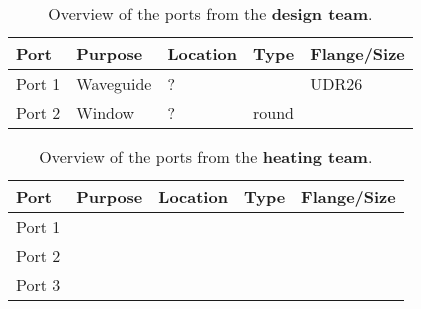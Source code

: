 \documentclass{article}
\begin{document}
\begin{table}[H]
    \centering
    \caption{Overview of the ports from the \textbf{design team}.}
    \begin{tabular}{>{\raggedright\arraybackslash}p{2cm} >{\raggedright\arraybackslash}p{3cm} >{\raggedright\arraybackslash}p{3.5cm} >{\raggedright\arraybackslash}p{3.5cm} >{\raggedright\arraybackslash}p{2cm}}
        \toprule
        \textbf{Port} & \textbf{Purpose} & \textbf{Location} & \textbf{Type} & \textbf{Flange/Size} \\
        \midrule
        Port 1        & Waveguide        & ?                 &               & UDR26                \\
        Port 2        & Window           & ?                 & round         &                      \\
        \bottomrule
    \end{tabular}
\end{table}


\begin{table}[H]
    \centering
    \caption{Overview of the ports from the \textbf{heating team}.}
    \begin{tabular}{>{\raggedright\arraybackslash}p{2cm} >{\raggedright\arraybackslash}p{3cm} >{\raggedright\arraybackslash}p{3.5cm} >{\raggedright\arraybackslash}p{3.5cm} >{\raggedright\arraybackslash}p{2cm}}
        \toprule
        \textbf{Port} & \textbf{Purpose} & \textbf{Location} & \textbf{Type} & \textbf{Flange/Size} \\
        \midrule
        Port 1        &                  &                   &               &                      \\
        Port 2        &                  &                   &               &                      \\
        Port 3        &                  &                   &               &                      \\
        \bottomrule
    \end{tabular}
\end{table}
\end{document}
